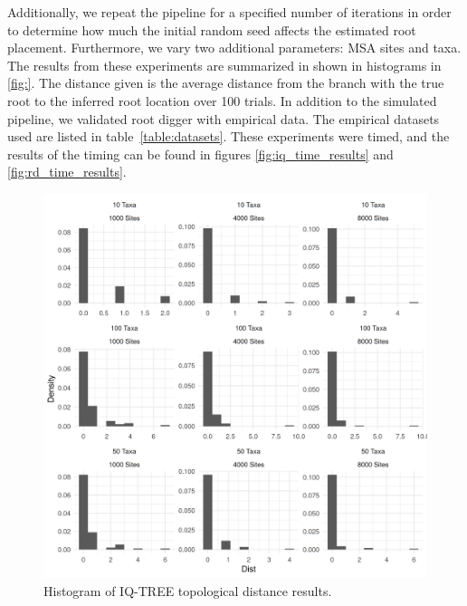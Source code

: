 \documentclass{article}
\begin{document}
Additionally, we repeat the pipeline for a specified number of iterations in
order to determine how much the initial random seed affects the estimated root
placement.
Furthermore, we vary two additional parameters: MSA sites and taxa.
The results from these experiments are summarized in shown in histograms in
\ref{fig:}.
The distance given is the average distance from the branch with the true root
to the inferred root location over 100 trials.
In addition to the simulated pipeline, we validated root digger with empirical
data.
The empirical datasets used are listed in table~\ref{table:datasets}.
These experiments were timed, and the results of the timing can be found in figures
\ref{fig:iq_time_results} and \ref{fig:rd_time_results}.

\begin{figure}
  \begin{center}
    \includegraphics[width=.9\linewidth]{./figs/timing_plots/iq_dist_hist.png}
    \caption{Histogram of IQ-TREE topological distance results.
    \label{fig:iq_dist_results}}
\end{center}
\end{figure}
\end{document}
